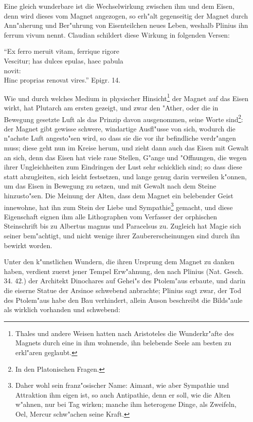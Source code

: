 \documentclass[a4paper, 11pt, oneside, polutonikogreek, german]{article}
\begin{document}
Eine gleich wunderbare ist die Wechselwirkung zwischen ihm und dem Eisen, denn wird dieses vom Magnet angezogen, so erh"alt gegenseitig der Magnet durch Ann"aherung und Ber"uhrung von Eisenteilchen neues Leben, weshalb Plinius ihn ferrum vivum nennt. Claudian schildert diese Wirkung in folgenden Versen:

"`Ex ferro meruit vitam, ferrique rigore\\
\hspace*{0.5cm} Vescitur; has dulces epulas, haec pabula\\
\hspace*{1.5cm} novit:\\
\hspace*{0.5cm} Hinc proprias renovat vires."' Epigr. 14.

Wie und durch welches Medium in physischer Hinsicht\footnote{Thales und andere Weisen hatten nach Aristoteles die Wunderkr"afte des Magnets durch eine in ihm wohnende, ihn belebende Seele am besten zu erkl"aren geglaubt.} der Magnet auf das Eisen wirkt, hat Plutarch am ersten gezeigt, und zwar den "Ather, oder die in Bewegung gesetzte Luft als das Prinzip davon ausgenommen, seine Worte sind\footnote{In den Platonischen Fragen.}: der Magnet gibt gewisse schwere, windartige Ausfl"usse von sich, wodurch die n"achste Luft angesto"sen wird, so dass sie die vor ihr befindliche verdr"angen muss; diese geht nun im Kreise herum, und zieht dann auch das Eisen mit Gewalt an sich, denn das Eisen hat viele raue Stellen, G"ange und "Offnungen, die wegen ihrer Ungleichheiten zum Eindringen der Lust sehr schicklich sind; so dass diese statt abzugleiten, sich leicht festsetzen, und lange genug darin verweilen k"onnen, um das Eisen in Bewegung zu setzen, und mit Gewalt nach dem Steine hinzusto"sen. Die Meinung der Alten, dass dem Magnet ein belebender Geist innewohne, hat ihn zum Stein der Liebe und Sympathie\footnote{Daher wohl sein franz"osischer Name: Aimant, wie aber Sympathie und Attraktion ihm eigen ist, so auch Antipathie, denn er soll, wie die Alten w"ahnen, nur bei Tag wirken; manche ihm heterogene Dinge, als Zweifeln, Oel, Mercur schw"achen seine Kraft.} gemacht, und diese Eigenschaft eignen ihm alle Lithographen vom Verfasser der orphischen Steinschrift bis zu Albertus magnus und Paracelsus zu. Zugleich hat Magie sich seiner bem"achtigt, und nicht wenige ihrer Zaubererscheinungen sind durch ihn bewirkt worden.

Unter den k"unstlichen Wundern, die ihren Ursprung dem Magnet zu danken haben, verdient zuerst jener Tempel Erw"ahnung, den nach Plinius (Nat. Gesch. 34. 42.) der Architekt Dinochares auf Gehei"s des Ptolem"aus erbaute, und darin die eiserne Statue der Arsinoe schwebend anbrachte; Plinius sagt zwar, der Tod des Ptolem"aus habe den Bau verhindert, allein Auson beschreibt die Bilds"aule als wirklich vorhanden und schwebend:
\end{document}
